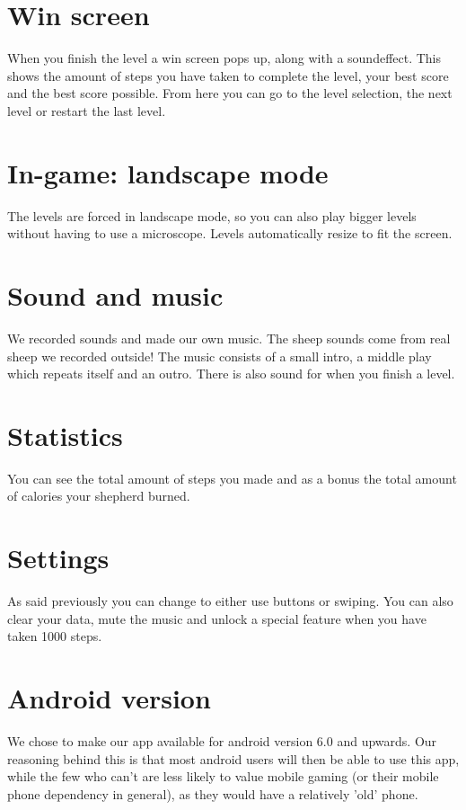 \documentclass{article}
\begin{document}
\section*{Win screen}
When you finish the level a win screen pops up, along with a soundeffect. This shows the amount of steps you have taken to complete the level, your best score and the best score possible. From here you can go to the level selection, the next level or restart the last level.

\section*{In-game: landscape mode}
The levels are forced in landscape mode, so you can also play bigger levels without having to use a microscope. Levels automatically resize to fit the screen.

\section*{Sound and music}
We recorded sounds and made our own music. The sheep sounds come from real sheep we recorded outside! The music consists of a small intro, a middle play which repeats itself and an outro. There is also sound for when you finish a level.

\section*{Statistics}
You can see the total amount of steps you made and as a bonus the total amount of calories your shepherd burned.

\section*{Settings}
As said previously you can change to either use buttons or swiping. You can also clear your data, mute the music and unlock a special feature when you have taken 1000 steps.

\section*{Android version}
We chose to make our app available for android version 6.0 and upwards. Our reasoning behind this is that most android users will then be able to use this app, while the few who can't are less likely to value mobile gaming (or their mobile phone dependency in general), as they would have a relatively 'old' phone.
\end{document}
